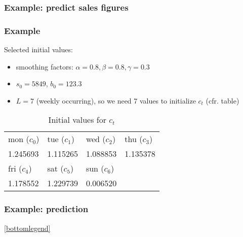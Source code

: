 \documentclass[aspectratio=169]{beamer}
\begin{document}
\begin{frame}
  \frametitle{Example: predict sales figures}
  
  \centering
\end{frame}

\begin{frame}
  \frametitle{Example}
  
  Selected initial values:
  
  \begin{itemize}
    \item smoothing factors: $\alpha = 0.8, \beta = 0.8, \gamma = 0.3$
    \item $s_0 = 5849$, $b_0 = 123.3$
    \item $L = 7$ (weekly occurring), so we need 7 values to initialize $c_t$ (cfr. table)
  \end{itemize}
  
  \begin{table}
    \centering
    \begin{tabular}{l|l|l|l}
      mon ($c_0$) & tue ($c_1$) & wed ($c_2$) & thu ($c_3$)  \\
      1.245693 & 1.115265 & 1.088853 & 1.135378 \\
      \hline \hline
      fri ($c_4$)  & sat ($c_5$)  & sun ($c_6$)  & \\
      1.178552 & 1.229739 & 0.006520 &
    \end{tabular}
    \caption{Initial values for $c_t$}
    \label{tab:winters-init-c}
  \end{table}
\end{frame}

\begin{frame}
  \frametitle{Example: prediction}
  
  
  \begin{center}
    
    \ref{bottomlegend}
  \end{center}
  
\end{frame}
\end{document}
